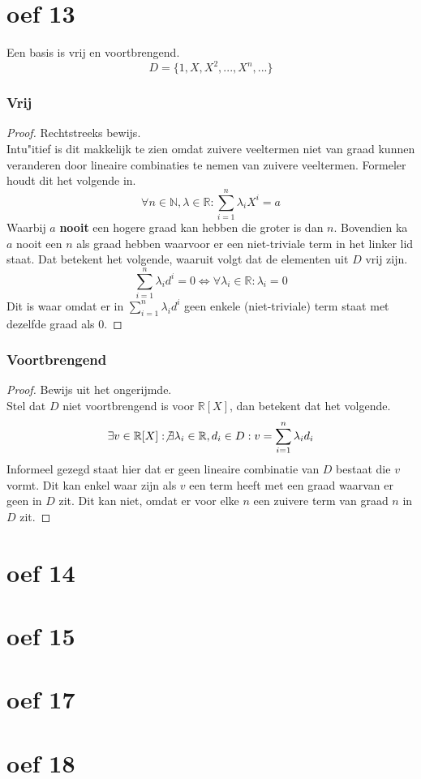 \documentclass[lineaire_algebra_oplossingen.tex]{subfiles}
\begin{document}
\section{oef 13}
Een basis is vrij en voortbrengend.
\[
D = \{1,X,X^2,...,X^n,...\}
\]
\subsubsection*{Vrij}
\begin{proof}
Rechtstreeks bewijs.\\
Intu"itief is dit makkelijk te zien omdat zuivere veeltermen niet van graad kunnen veranderen door lineaire combinaties te nemen van zuivere veeltermen. Formeler houdt dit het volgende in.
\[
\forall n\in \mathbb{N},\lambda \in \mathbb{R}: \sum_{i=1}^n\lambda_iX^i = a
\] 
Waarbij $a$ \textbf{nooit} een hogere graad kan hebben die groter is dan $n$. Bovendien ka $a$ nooit een $n$ als graad hebben waarvoor er een niet-triviale term in het linker lid staat.
Dat betekent het volgende, waaruit volgt dat de elementen uit $D$ vrij zijn.
\[
\sum_{i=1}^n\lambda_id^i = 0 \Leftrightarrow \forall \lambda_i \in \mathbb{R}: \lambda_i =0
\]
Dit is waar omdat er in $\sum_{i=1}^n\lambda_id^i$ geen enkele (niet-triviale) term staat met dezelfde graad als $0$.
\end{proof}

\subsubsection*{Voortbrengend}
\begin{proof}
Bewijs uit het ongerijmde.\\
Stel dat $D$ niet voortbrengend is voor $\mathbb{R}[X]$, dan betekent dat het volgende.
\[
\exists v \in \mathbb{R}[X]: \not\exists \lambda_i\in \mathbb{R},d_i \in D: v = \sum_{i=1}^n\lambda_id_i
\]
Informeel gezegd staat hier dat er geen lineaire combinatie van $D$ bestaat die $v$ vormt.
Dit kan enkel waar zijn als $v$ een term heeft met een graad waarvan er geen in $D$ zit. Dit kan niet, omdat er voor elke $n$ een zuivere term van graad $n$ in $D$ zit.

\end{proof}

\section{oef 14}
\section{oef 15}
\section{oef 17}
\section{oef 18}
\end{document}
